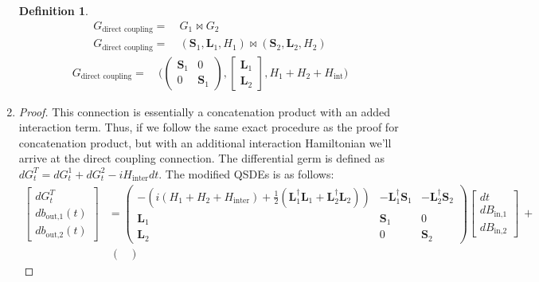 \documentclass[a4paper]{article}
\theoremstyle{definition}
\newtheorem{definition}{Definition}[section]
\begin{document}
\begin{enumerate}[label=(\roman*)]
\begin{definition}
\begin{align*}
    G_{\text{direct coupling}} = & \ G_1 \bowtie G_2 \\
    G_{\text{direct coupling}} = & \ (\textbf{S}_1,\textbf{L}_1,H_1) \bowtie (\textbf{S}_2,\textbf{L}_2,H_2)
\end{align*}
\begin{align}
    G_{\text{direct coupling}} = & \ \Bigg( \begin{pmatrix} \textbf{S}_1 & 0 \\ 0 & \textbf{S}_1\end{pmatrix},\begin{bmatrix} \textbf{L}_1 \\ \textbf{L}_2 \end{bmatrix},H_1 + H_2 + H_{\text{int}} \Bigg)
    \label{eq:direct_coupling}
\end{align}
\end{definition}
\item
\begin{proof}
This connection is essentially a concatenation product with an added interaction term. Thus, if we follow the same exact procedure as the proof for concatenation product, but with an additional interaction Hamiltonian we'll arrive at the direct coupling connection. The differential germ is defined as $dG^T_t = dG^1_t + dG^2_t - iH_{\text{inter}}dt$. The modified QSDEs is as follows: 
\begin{align}
    \begin{bmatrix}
    dG^T_t \\
    db_{\text{out,1}}(t) \\
    db_{\text{out,2}}(t)
    \end{bmatrix} & = 
    \begin{pmatrix}
     -(i(H_1 + H_2 + H_{\text{inter}}) + \frac{1}{2}(\textbf{L}_1^\dagger \textbf{L}_1 + \textbf{L}_2^\dagger \textbf{L}_2)) & - \textbf{L}_1^\dagger \textbf{S}_1 & - \textbf{L}_2^\dagger \textbf{S}_2 \\
     \textbf{L}_1 & \textbf{S}_1 & 0 \\
     \textbf{L}_2 & 0 & \textbf{S}_2
    \end{pmatrix}
    \begin{bmatrix}
    dt \\
    dB_\text{in,1} \\
    dB_\text{in,2}
    \end{bmatrix} \ + \nonumber \\
    & \
    \begin{pmatrix}

\end{pmatrix}
\end{align}
\end{proof}
\end{enumerate}
\end{document}
